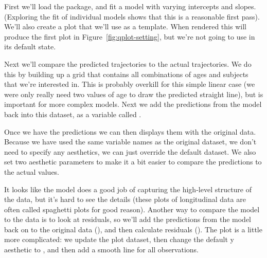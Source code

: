 First we'll load the  package, and fit a model with varying intercepts and slopes.  (Exploring the fit of individual models shows that this is a reasonable first pass).  We'll also create a plot that we'll use as a template.  When rendered this will produce the first plot in Figure~\ref{fig:qplot-setting}, but we're not going to use in its default state.

% 


Next we'll compare the predicted trajectories to the actual trajectories.  We do this by building up a grid that contains all combinations of ages and subjects that we're interested in.  This is probably overkill for this simple linear case (we were only really need two values of age to draw the predicted straight line), but is important for more complex models.  Next we add the predictions from the model back into this dataset, as a variable called .  

% 
% 


Once we have the predictions we can then displays them with the original data.  Because we have used the same variable names as the original  dataset, we don't need to specify any aesthetics, we can just override the default dataset.  We also set two aesthetic parameters to make it a bit easier to compare the predictions to the actual values.

% 


It looks like the model does a good job of capturing the high-level structure of the data, but it's hard to see the details (these plots of longitudinal data are often called spaghetti plots for good reason).  Another way to compare the model to the data is to look at residuals, so we'll add the predictions from the model back on to the original data (), and then calculate residuals ().  The plot is a little more complicated: we update the plot dataset, then change the default y aesthetic to , and then add a smooth line for all observations.

